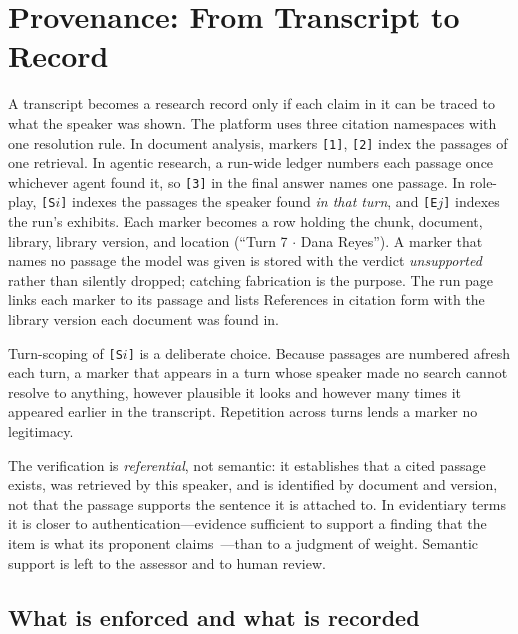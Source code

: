 \documentclass[acmsmall,screen,review]{acmart}
\newcommand{\mk}[1]{\texttt{[#1]}}
\begin{document}
\section{Provenance: From Transcript to Record}
\label{sec:provenance}

A transcript becomes a research record only if each claim in it can be traced to what the speaker was shown. The platform uses three citation namespaces with one resolution rule. In document analysis, markers \mk{1}, \mk{2} index the passages of one retrieval. In agentic research, a run-wide ledger numbers each passage once whichever agent found it, so \mk{3} in the final answer names one passage. In role-play, \mk{S$i$} indexes the passages the speaker found \emph{in that turn}, and \mk{E$j$} indexes the run's exhibits. Each marker becomes a row holding the chunk, document, library, library version, and location (``Turn 7 $\cdot$ Dana Reyes''). A marker that names no passage the model was given is stored with the verdict \emph{unsupported} rather than silently dropped; catching fabrication is the purpose. The run page links each marker to its passage and lists References in citation form with the library version each document was found in.

Turn-scoping of \mk{S$i$} is a deliberate choice. Because passages are numbered afresh each turn, a marker that appears in a turn whose speaker made no search cannot resolve to anything, however plausible it looks and however many times it appeared earlier in the transcript. Repetition across turns lends a marker no legitimacy.

The verification is \emph{referential}, not semantic: it establishes that a cited passage exists, was retrieved by this speaker, and is identified by document and version, not that the passage supports the sentence it is attached to. In evidentiary terms it is closer to authentication---evidence sufficient to support a finding that the item is what its proponent claims~\cite{fre901}---than to a judgment of weight. Semantic support is left to the assessor and to human review.

\subsection{What is enforced and what is recorded}
\label{sec:enforce}
\end{document}

